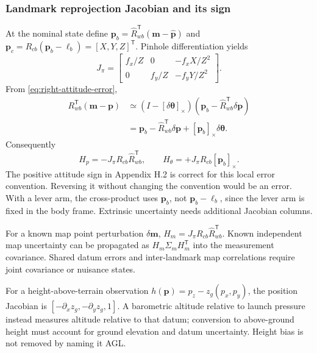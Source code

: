 \subsubsection{Landmark reprojection Jacobian and its sign}

At the nominal state define
$\boldsymbol p_b=\widehat R_{wb}^{\mathsf T}(\boldsymbol m-
\widehat{\boldsymbol p})$ and
$\boldsymbol p_c=R_{cb}(\boldsymbol p_b-\boldsymbol\ell_b)
=[X,Y,Z]^{\mathsf T}$. Pinhole differentiation yields
\begin{equation}
 J_\pi=\begin{bmatrix}f_x/Z&0&-f_xX/Z^2\\
                        0&f_y/Z&-f_yY/Z^2\end{bmatrix}.
\end{equation}
From \eqref{eq:right-attitude-error},
\begin{align}
 R_{wb}^{\mathsf T}(\boldsymbol m-\boldsymbol p)
 &\simeq(I-[\delta\boldsymbol\theta]_\times)
          (\boldsymbol p_b-\widehat R_{wb}^{\mathsf T}\delta\boldsymbol p)\\
 &=\boldsymbol p_b-\widehat R_{wb}^{\mathsf T}\delta\boldsymbol p
                  +[\boldsymbol p_b]_\times\delta\boldsymbol\theta.
\end{align}
Consequently
\begin{equation}
 H_p=-J_\pi R_{cb}\widehat R_{wb}^{\mathsf T},\qquad
 H_\theta=\boxed{+J_\pi R_{cb}[\boldsymbol p_b]_\times}.
 \label{eq:reprojection-jacobian}
\end{equation}
The positive attitude sign in Appendix H.2 is correct for this local
error convention. Reversing it without changing the convention would
be an error. With a lever arm, the cross-product uses $\boldsymbol p_b$,
not $\boldsymbol p_b-\boldsymbol\ell_b$, since the lever arm is fixed in
the body frame. Extrinsic uncertainty needs additional Jacobian columns.

For a known map point perturbation $\delta\boldsymbol m$,
$H_m=J_\pi R_{cb}\widehat R_{wb}^{\mathsf T}$. Known independent map
uncertainty can be propagated as $H_m\Sigma_m H_m^{\mathsf T}$ into the
measurement covariance. Shared datum errors and inter-landmark map
correlations require joint covariance or nuisance states.

For a height-above-terrain observation
$h(\boldsymbol p)=p_z-z_g(p_x,p_y)$, the position Jacobian is
$[-\partial_xz_g,-\partial_yz_g,1]$. A barometric altitude relative to
launch pressure instead measures altitude relative to that datum;
conversion to above-ground height must account for ground elevation
and datum uncertainty. Height bias is not removed by naming it AGL.

